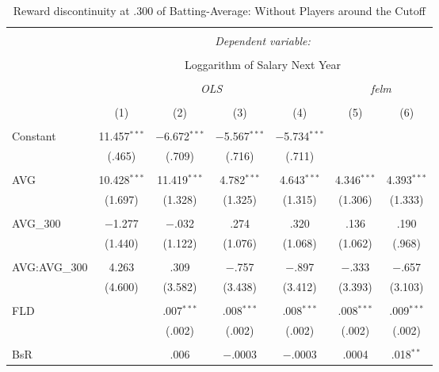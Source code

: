 
\begin{table}[H] \centering
  \caption{Reward discontinuity at .300 of Batting-Average: Without Players around the Cutoff}
  \label{AVG300_E}
\tiny
\begin{tabular}{@{\extracolsep{5pt}}lcccccc}
\\[-1.8ex]\hline
\hline \\[-1.8ex]
 & \multicolumn{6}{c}{\textit{Dependent variable:}} \\
\cline{2-7}
\\[-1.8ex] & \multicolumn{6}{c}{Loggarithm of Salary Next Year} \\
\\[-1.8ex] & \multicolumn{4}{c}{\textit{OLS}} & \multicolumn{2}{c}{\textit{felm}} \\
\\[-1.8ex] & (1) & (2) & (3) & (4) & (5) & (6)\\
\hline \\[-1.8ex]
 Constant & 11.457$^{***}$ & $-$6.672$^{***}$ & $-$5.567$^{***}$ & $-$5.734$^{***}$ &  &  \\
  & (.465) & (.709) & (.716) & (.711) &  &  \\
  & & & & & & \\
 AVG & 10.428$^{***}$ & 11.419$^{***}$ & 4.782$^{***}$ & 4.643$^{***}$ & 4.346$^{***}$ & 4.393$^{***}$ \\
  & (1.697) & (1.328) & (1.325) & (1.315) & (1.306) & (1.333) \\
  & & & & & & \\
 AVG\_300 & $-$1.277 & $-$.032 & .274 & .320 & .136 & .190 \\
  & (1.440) & (1.122) & (1.076) & (1.068) & (1.062) & (.968) \\
  & & & & & & \\
  AVG:AVG\_300 & 4.263 & .309 & $-$.757 & $-$.897 & $-$.333 & $-$.657 \\
  & (4.600) & (3.582) & (3.438) & (3.412) & (3.393) & (3.103) \\
  & & & & & & \\
 FLD &  & .007$^{***}$ & .008$^{***}$ & .008$^{***}$ & .008$^{***}$ & .009$^{***}$ \\
  &  & (.002) & (.002) & (.002) & (.002) & (.002) \\
  & & & & & & \\
 BsR &  & .006 & $-$.0003 & $-$.0003 & .0004 & .018$^{**}$ \\

\end{tabular}
\end{table}
